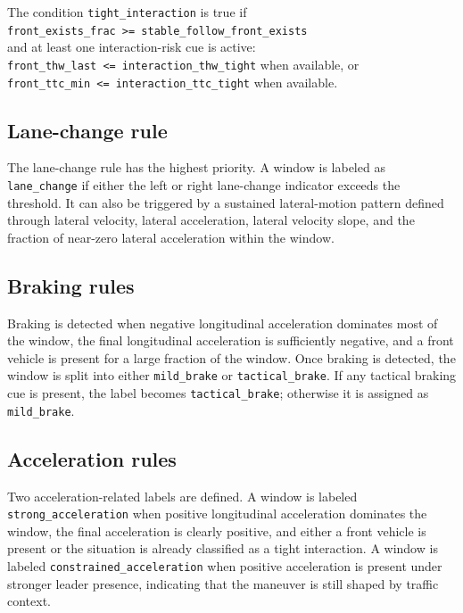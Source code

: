 The condition \texttt{tight\_interaction} is true if\\
\texttt{front\_exists\_frac >= stable\_follow\_front\_exists}\\
and at least one interaction-risk cue is active:\\
\texttt{front\_thw\_last <= interaction\_thw\_tight} when available, or\\
\texttt{front\_ttc\_min <= interaction\_ttc\_tight} when available.\\

\subsection*{Lane-change rule}

The lane-change rule has the highest priority. 
A window is labeled as \texttt{lane\_change} if either the left or right lane-change indicator exceeds the threshold. 
It can also be triggered by a sustained lateral-motion pattern defined through lateral velocity, lateral acceleration, lateral velocity slope, and the fraction of near-zero lateral acceleration within the window.

\subsection*{Braking rules}

Braking is detected when negative longitudinal acceleration dominates most of the window, the final longitudinal acceleration is sufficiently negative, and a front vehicle is present for a large fraction of the window. 
Once braking is detected, the window is split into either \texttt{mild\_brake} or \texttt{tactical\_brake}. 
If any tactical braking cue is present, the label becomes \texttt{tactical\_brake}; otherwise it is assigned as \texttt{mild\_brake}.

\subsection*{Acceleration rules}

Two acceleration-related labels are defined. 
A window is labeled \texttt{strong\_acceleration} when positive longitudinal acceleration dominates the window, the final acceleration is clearly positive, and either a front vehicle is present or the situation is already classified as a tight interaction. 
A window is labeled \texttt{constrained\_acceleration} when positive acceleration is present under stronger leader presence, indicating that the maneuver is still shaped by traffic context.

